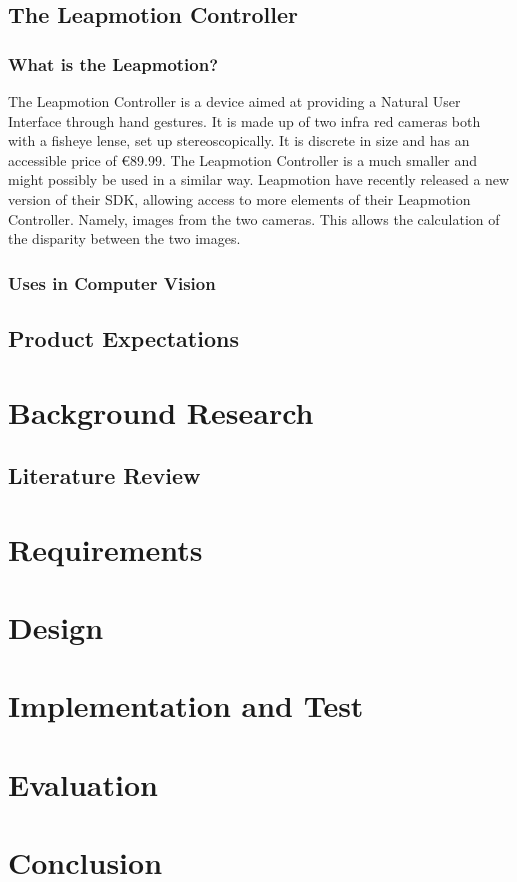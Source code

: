 \documentclass[12pt,a4paper]{report}
\begin{document}
		\section{The Leapmotion Controller}
			\subsection{What is the Leapmotion?}
The Leapmotion Controller is a device aimed at providing a Natural User Interface through hand gestures.
It is made up of two infra red cameras both with a fisheye lense, set up stereoscopically.
It is discrete in size and has an accessible price of €89.99.
The Leapmotion Controller is a much smaller and might possibly be used in a similar way.
Leapmotion have recently released a new version of their SDK, allowing access to more elements of their Leapmotion Controller. 
Namely, images from the two cameras.
This allows the calculation of the disparity between the two images. %

			\subsection{Uses in Computer Vision}
			
		\section{Product Expectations}
		
	\chapter{Background Research}
		\section{Literature Review}
			


	\chapter{Requirements}
	\chapter{Design}
	\chapter{Implementation and Test}
	\chapter{Evaluation}
	\chapter{Conclusion}

	
	
\end{document}
